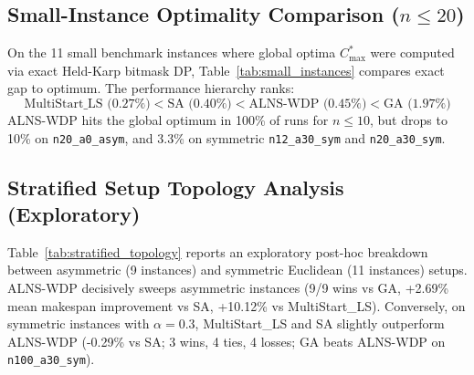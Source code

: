 \documentclass[journal]{IEEEtran}
\begin{document}
\subsection{Small-Instance Optimality Comparison ($n \le 20$)}
On the 11 small benchmark instances where global optima $C_{\max}^*$ were computed via exact Held-Karp bitmask DP, Table~\ref{tab:small_instances} compares exact gap to optimum. The performance hierarchy ranks:
\begin{equation}
    \text{MultiStart\_LS (0.27\%)} < \text{SA (0.40\%)} < \text{ALNS-WDP (0.45\%)} < \text{GA (1.97\%)}
\end{equation}
ALNS-WDP hits the global optimum in 100\% of runs for $n \le 10$, but drops to 10\% on \texttt{n20\_a0\_asym}, and 3.3\% on symmetric \texttt{n12\_a30\_sym} and \texttt{n20\_a30\_sym}.

\begin{table}[t]
\centering
\scriptsize
\setlength{\tabcolsep}{2pt}
\caption{Stratified Performance: Asymmetric vs Symmetric Topologies.}
\label{tab:stratified_topology}

\end{table}

\subsection{Stratified Setup Topology Analysis (Exploratory)}
Table~\ref{tab:stratified_topology} reports an exploratory post-hoc breakdown between asymmetric (9 instances) and symmetric Euclidean (11 instances) setups. ALNS-WDP decisively sweeps asymmetric instances (9/9 wins vs GA, +2.69\% mean makespan improvement vs SA, +10.12\% vs MultiStart\_LS). Conversely, on symmetric instances with $\alpha = 0.3$, MultiStart\_LS and SA slightly outperform ALNS-WDP (-0.29\% vs SA; 3 wins, 4 ties, 4 losses; GA beats ALNS-WDP on \texttt{n100\_a30\_sym}).
\end{document}
